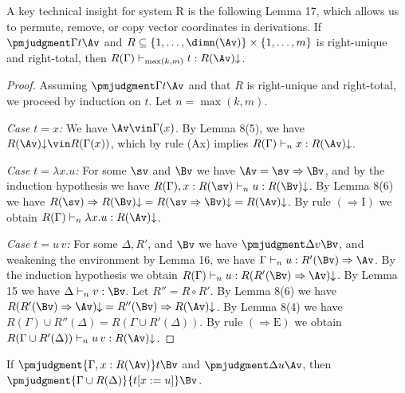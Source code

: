 A key technical insight for system R is the following Lemma 17, which allows us to permute, remove, or copy vector coordinates in derivations.
 If $\pmjudgment\Gamma t\Av$ and $R\subseteq\{1,\ldots,\dimn(\Av)\}\times\{1,\ldots,m\}$ is right-unique and right-total, then $R(\Gamma)\vdash_{\max(k,m)}t:R(\Av)\mathord\downarrow$.
\begin{proof}
Assuming $\pmjudgment\Gamma t\Av$ and that $R$ is right-unique and right-total, we proceed by induction on $t$. Let $n=\max(k,m)$.\par
\emph{Case $t=x$:} We have $\Av\vin\Gamma(x)$. By Lemma 8(5), we have $R(\Av)\mathord\downarrow\vin R(\Gamma(x))$, which by rule (Ax) implies $R(\Gamma)\vdash_n x:R(\Av)\mathord\downarrow$.\par
\emph{Case $t=\lambda x.u$:} For some $\sv$ and $\Bv$ we have $\Av=\sv\Rightarrow\Bv$, and by the induction hypothesis we have $R(\Gamma),x:R(\sv)\vdash_n u:R(\Bv)\mathord\downarrow$. By Lemma 8(6) we have $R(\sv)\Rightarrow R(\Bv)\mathord\downarrow=R(\sv\Rightarrow\Bv)\mathord\downarrow=R(\Av)\mathord\downarrow$. By rule $(\Rightarrow\mathrm I)$ we obtain $R(\Gamma)\vdash_n\lambda x.u:R(\Av)\mathord\downarrow$.\par
\emph{Case $t=u\,v$:} For some $\Delta,R'$, and $\Bv$ we have $\pmjudgment\Delta v\Bv$, and weakening the environment by Lemma 16, we have $\Gamma\vdash_n u:R'(\Bv)\Rightarrow\Av$. By the induction hypothesis we obtain $R(\Gamma)\vdash_n u:R(R'(\Bv)\Rightarrow\Av)\mathord\downarrow$. By Lemma 15 we have $\Delta\vdash_n v:\Bv$. Let $R''=R\circ R'$. By Lemma 8(6) we have $R(R'(\Bv)\Rightarrow\Av)\mathord\downarrow=R''(\Bv)\Rightarrow R(\Av)\mathord\downarrow$. By Lemma 8(4) we have $R(\Gamma)\cup R''(\Delta)=R(\Gamma\cup R'(\Delta))$. By rule $(\Rightarrow\mathrm E)$ we obtain $R(\Gamma\cup R'(\Delta))\vdash_n u\,v:R(\Av)\mathord\downarrow$.
\end{proof}
 If $\pmjudgment{\Gamma,x:R(\Av)}t\Bv$ and $\pmjudgment\Delta u\Av$, then $\pmjudgment{\Gamma\cup R(\Delta)}{t[x:=u]}\Bv$.
